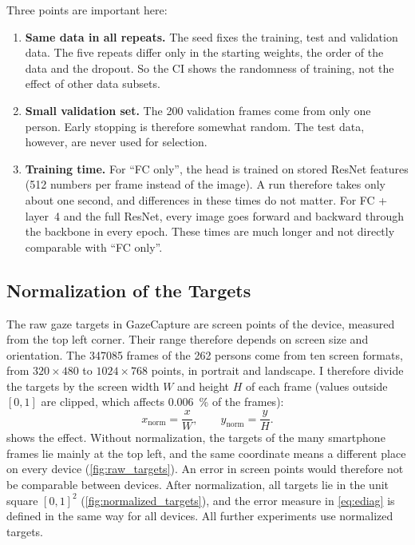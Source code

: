 Three points are important here:
\begin{enumerate}[nosep]
  \item \textbf{Same data in all repeats.} The seed fixes the training, test and
        validation data. The five repeats differ only in the starting weights,
        the order of the data and the dropout. So the CI shows the randomness
        of training, not the effect of other data subsets.
  \item \textbf{Small validation set.} The 200 validation frames come from only
        one person. Early stopping is therefore somewhat random. The test data,
        however, are never used for selection.
  \item \textbf{Training time.} For \enquote{FC only}, the head is trained on
        stored ResNet features (512 numbers per frame instead of the image). A
        run therefore takes only about one second, and differences in these
        times do not matter. For FC + layer~4 and the full ResNet, every image
        goes forward and backward through the backbone in every epoch. These
        times are much longer and not directly comparable with \enquote{FC
        only}.
\end{enumerate}

\subsection{Normalization of the Targets}
\label{sec:normalization}

The raw gaze targets in GazeCapture are screen points of the device, measured
from the top left corner. Their range therefore depends on screen size and
orientation. The \num{347085} frames of the 262 persons come from ten screen
formats, from $320\times480$ to $1024\times768$ points, in portrait and
landscape. I therefore divide the targets by the screen width $W$ and height
$H$ of each frame (values outside $[0,1]$ are clipped, which
affects \SI{0.006}{\percent} of the frames):
\begin{equation}
  x_{\mathrm{norm}} = \frac{x}{W},\qquad y_{\mathrm{norm}} = \frac{y}{H}.
\end{equation}
 shows the effect. Without normalization, the targets
of the many smartphone frames lie mainly at the top left, and the same
coordinate means a different place on every device (\cref{fig:raw_targets}). An
error in screen points would therefore not be comparable between devices. After
normalization, all targets lie in the unit square $[0,1]^2$
(\cref{fig:normalized_targets}), and the error measure in \cref{eq:ediag} is
defined in the same way for all devices. All further experiments use normalized
targets.

